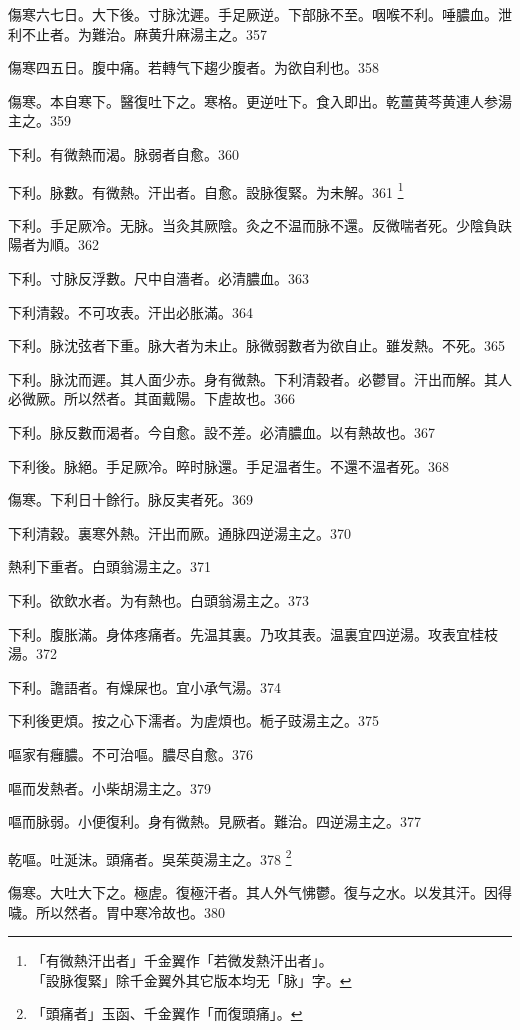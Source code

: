 傷寒六七日。大下後。{\khaaitp 寸}脉沈遲。手足厥逆。下部脉不至。咽喉不利。唾膿血。泄利不止者。为難治。麻黄升麻湯主之。357

傷寒四五日。腹中痛。若轉气下趨少腹者。为欲自利也。358

傷寒。本自寒下。醫復吐{\khaaitp 下}之。寒格。更逆吐{\khaaitp 下}。食入即出。乾薑黄芩黄連人参湯主之。359

下利。有微熱而渴。脉弱者自愈。360

下利。脉數。有微熱。汗出者。自愈。設{\khaaitp 脉}復緊。为未解。361
	\footnote{「有微熱汗出者」千金翼作「若微发熱汗出者」。\\「設脉復緊」除千金翼外其它版本均无「脉」字。}

下利。手足厥{\khaaitp 冷}。无脉。{\khaaitp 当灸其厥陰。}灸之不温{\khaaitp 而脉不還}。反微喘者死。少陰負趺陽者为順。362

下利。寸脉反浮數。尺中自濇者。必清膿血。363

下利清穀。不可攻表。汗出必胀滿。364

下利。脉沈弦者下重。脉大者为未止。脉微弱數者为欲自止。雖发熱。不死。365

下利。脉沈而遲。其人面少赤。身有微熱。下利清穀者。必鬱冒。汗出而解。其人必微厥。所以然者。其面戴陽。下虗故也。366

下利。脉反數而渴者。今自愈。設不差。必清膿血。以有熱故也。367

下利後。脉絕。手足厥{\khaaitp 冷}。晬时脉還。手足温者生。不還{\khaaitp 不温}者死。368

傷寒。下利日十餘行。脉反実者死。369

下利清穀。裏寒外熱。汗出而厥。通脉四逆湯主之。370

熱利下重者。白頭翁湯主之。371

下利。欲飲水者。为有熱也。白頭翁湯主之。373

下利。腹{\khaaitp 胀}滿。身体疼痛者。先温其裏。乃攻其表。温裏宜四逆湯。攻表宜桂枝湯。372

下利。譫語者。有燥屎也。宜{\khaaitp 小}承气湯。374

下利後更煩。按之心下濡者。为虗煩也。栀子{\khaaitp 豉}湯主之。375

嘔家有癰膿。不可治嘔。膿尽自愈。376

嘔而发熱者。小柴胡湯主之。379

嘔而脉弱。小便復利。身有微熱。見厥者。難治。四逆湯主之。377

乾嘔。吐涎沫。頭痛者。{\khaaitp 吳}茱萸湯主之。378
	\footnote{「頭痛者」玉函、千金翼作「而復頭痛」。}

傷寒。大吐大下之。極虗。復極汗者。其人外气怫鬱。復与之水。以发其汗。因得噦。所以然者。胃中寒冷故也。380

